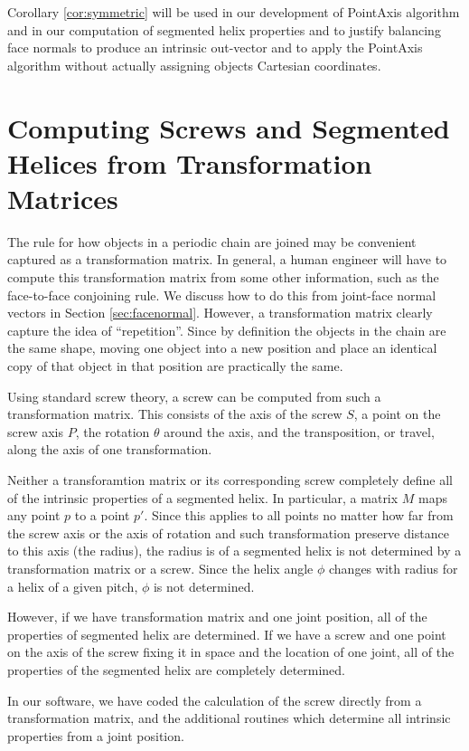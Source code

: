 \documentclass[11pt]{article}
\begin{document}
{Corollary \ref{cor:symmetric} will be used in our development of PointAxis algorithm
and in our computation of segmented helix properties and to justify balancing face normals
to produce an intrinsic out-vector and to apply the PointAxis algorithm
without actually assigning objects Cartesian coordinates.

\section{Computing Screws and Segmented Helices from Transformation Matrices}

The rule for how objects in a periodic chain are joined may be convenient captured as a transformation
matrix. In general, a human engineer will have to compute this transformation matrix from some other
information, such as the face-to-face conjoining rule. We discuss how to do this from joint-face normal
vectors in Section \ref{sec:facenormal}. However, a transformation matrix clearly
capture the idea of ``repetition''. Since by definition the objects in the chain are the same shape,
moving one object into a new position and place an identical copy of that object in that position
are practically the same.

Using standard screw theory\cite{wittenburg2016kinematics}, a screw can be computed from such
a transformation matrix. This consists of the axis of the screw $S$, a point on the screw axis $P$,
the rotation $\theta$ around the axis, and the
transposition, or travel, along the axis of one transformation.

Neither a transforamtion matrix or its corresponding screw completely define all of the intrinsic
properties of a segmented helix. In particular, a matrix $M$ maps any point $p$ to a point $p'$.
Since this applies to all points no matter how far from the screw axis or the axis of rotation and
such transformation preserve distance to this axis (the radius), the radius is of a segmented helix
is not determined by a transformation matrix or a screw. Since the helix angle $\phi$ changes
with radius for a helix of a given pitch, $\phi$ is not determined.

However, if we have transformation matrix and one joint position, all of the properties of segmented
helix are determined. If we have a screw and one point on the axis of the screw fixing it in space
and the location of one joint, all of the properties of the segmented helix are completely determined.

In our software, we have coded the calculation of the screw directly from a transformation matrix, and
the additional routines which determine all intrinsic properties from a joint position.

}
\end{document}
